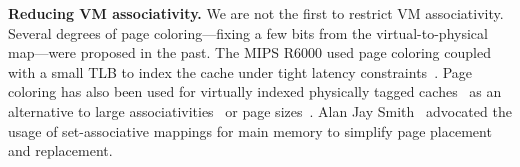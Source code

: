 
\noindent\textbf{Reducing VM associativity.} We are not the first to restrict VM associativity. Several degrees of page coloring---fixing a few bits from the virtual-to-physical map---were proposed in the past. The MIPS R6000 used page coloring coupled with a small TLB to index the cache under tight latency constraints~\cite{taylor:tlb}. Page coloring has also been used for virtually indexed physically tagged caches~\cite{chiueh:eliminating} as an alternative to large associativities~\cite{gustafson:ibm} or page sizes~\cite{jouppi:architectural}. Alan Jay Smith~\cite{smith:comparative} advocated the usage of set-associative mappings for main memory to simplify page placement and replacement. 




